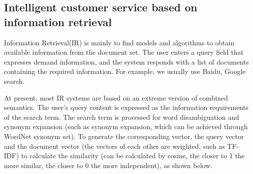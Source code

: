 \documentclass[11pt,en,number]{elegantpaper}
\begin{document}
	\subsection{Intelligent customer service based on information retrieval}
	Information Retrieval(IR) is mainly to find models and algorithms to obtain available information from the document set. The user enters a query field that expresses demand information, and the system responds with a list of documents containing the required information. For example, we usually use Baidu, Google search.
	
	At present, most IR systems are based on an extreme version of combined semantics. The user's query content is expressed as the information requirements of the search term. The search term is processed for word disambiguation and synonym expansion (such as synonym expansion, which can be achieved through WordNet synonym set)\cite{7}. To generate the corresponding vector, the query vector and the document vector (the vectors of each other are weighted, such as TF-IDF) to calculate the similarity (can be calculated by cosine, the closer to 1 the more similar, the closer to 0 the more independent), as shown below.
	
\end{document}
